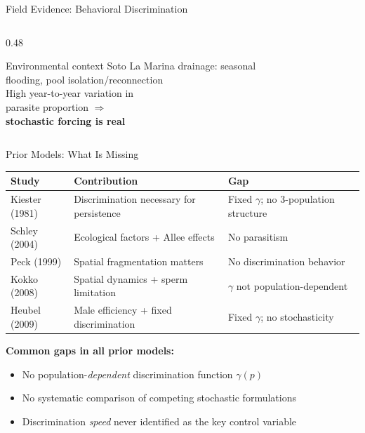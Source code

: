 \documentclass{beamer}
\begin{document}
\begin{frame}{Field Evidence: Behavioral Discrimination}
\begin{columns}[T]
\begin{column}{0.48\textwidth}
      \vspace{0.2cm}
      \begin{block}{Environmental context}
        Soto La Marina drainage: seasonal\\
        flooding, pool isolation/reconnection\\[4pt]
        High year-to-year variation in\\
        parasite proportion $\Rightarrow$\\
        \textbf{stochastic forcing is real}
      \end{block}
    \end{column}
  \end{columns}

\end{frame}

\begin{frame}{Prior Models: What Is Missing}
  \footnotesize

  \begin{tabular}{p{2.1cm}p{3.1cm}p{4.1cm}}
    \toprule
    \textbf{Study} & \textbf{Contribution} & \textbf{Gap} \\
    \midrule
    Kiester (1981) & Discrimination necessary for persistence & Fixed $\gamma$; no 3-population structure \\[4pt]
    Schley (2004) & Ecological factors + Allee effects & No parasitism \\[4pt]
    Peck (1999) & Spatial fragmentation matters & No discrimination behavior \\[4pt]
    Kokko (2008) & Spatial dynamics + sperm limitation & $\gamma$ not population-dependent \\[4pt]
    Heubel (2009) & Male efficiency + fixed discrimination & Fixed $\gamma$; no stochasticity \\
    \bottomrule
  \end{tabular}

  \vspace{0.4cm}
  \textbf{Common gaps in all prior models:}
  \begin{itemize}
    \item No population-\emph{dependent} discrimination function $\gamma(p)$
    \item No systematic comparison of competing stochastic formulations
    \item Discrimination \emph{speed} never identified as the key control variable
  \end{itemize}

\end{frame}
\end{document}
